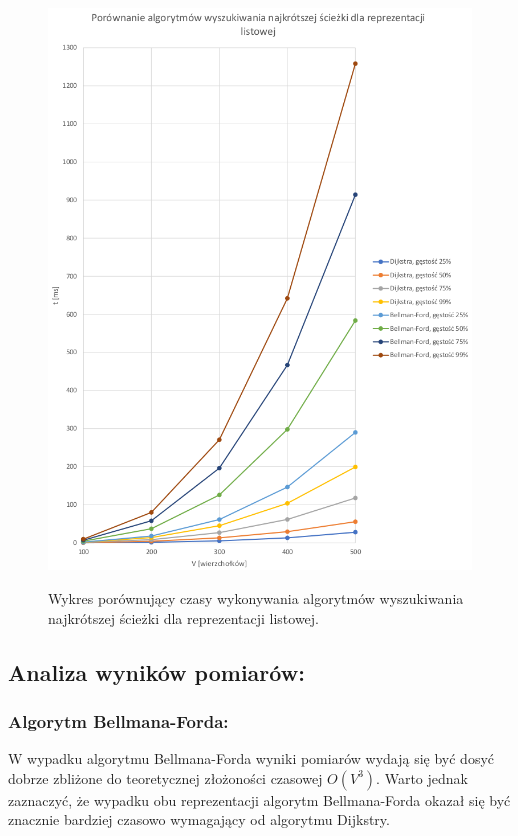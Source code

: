 \documentclass[a4paper,12pt]{article}
\begin{document}
\begin{figure}[H]
	\centering
	\caption{\centering Wykres porównujący czasy wykonywania algorytmów wyszukiwania najkrótszej ścieżki dla reprezentacji listowej.}
	\includegraphics[width=14cm]{fig3.png}
	\label{fig.wykres-lista-shortpath}
\end{figure}

\subsection{Analiza wyników pomiarów:}

\subsubsection{Algorytm Bellmana-Forda:}
W wypadku algorytmu Bellmana-Forda wyniki pomiarów wydają się być dosyć dobrze zbliżone do teoretycznej złożoności czasowej $O(V^3)$. Warto jednak zaznaczyć, że wypadku obu reprezentacji algorytm Bellmana-Forda okazał się być znacznie bardziej czasowo wymagający od algorytmu Dijkstry.
\end{document}
